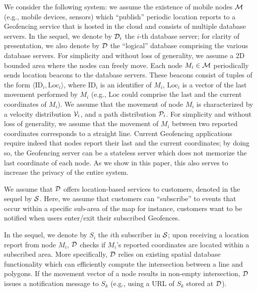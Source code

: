 \documentclass{llncs}
\begin{document}
We consider the following system: we assume the existence of mobile nodes $\cal M$ (e.g., mobile devices, sensors) which ``publish'' periodic location reports to a Geofencing service that is hosted in the cloud and consists of multiple database servers.
In the sequel, we denote by ${\cal D}_i$ the $i$-th database server; for clarity of presentation, we also denote by $\cal D$ the ``logical'' database comprising the various database servers. For simplicity and without loss of generality, we assume a 2D bounded area where the nodes can freely move. Each node ${M}_{i} \in {\cal M}$ periodically sends location beacons to the database servers. These beacons consist of tuples of the form $\langle \mathrm{ID}_i, {\mathrm{Loc}}_i\rangle$, where $\mathrm{ID}_{i}$ is an identifier of ${M}_{i}$,
${\mathrm{Loc}}_i$ is a vector of the last movement performed by ${M}_{i}$ (e.g., $\mathrm{Loc}$ could comprise the last and the current coordinates of ${M}_{i}$). We assume that the movement of node ${M}_{i}$ is characterized
by a velocity distribution ${\cal V}_{i}$, and a path distribution ${\cal P}_{i}$. For simplicity and without loss of generality, we assume that the movement of ${M}_{i}$ between two reported coordinates
corresponds to a straight line. Current Geofencing applications require indeed that nodes report their last and the current coordinates; by doing so, the Geofencing server can
be a stateless server which does not memorize
the last coordinate of each node. As we show in this paper, this also serves to increase the privacy of the entire system.

We assume that $\cal D$ offers location-based services to customers, denoted in the sequel by $\cal S$. Here, we assume that customers can ``subscribe'' to events that
occur within a specific sub-area of the map for instance, customers want to be notified when users enter/exit their subscribed Geofences.

In the sequel, we denote by ${S}_{i}$ the $i$th subscriber in $\cal S$; upon receiving a location report from node ${M}_{i}$, $\cal D$ checks if
${M}_{i}$'s reported coordinates are located within a subscribed area. More specifically, $\cal D$ relies on existing spatial database functionality which can efficiently compute the intersection between a line and polygons.
If the movement vector of a node results in non-empty intersection, $\cal D$ issues a notification message to ${S}_{k}$ (e.g., using a URL of ${S}_{k}$ stored at $\cal D$).
\end{document}
